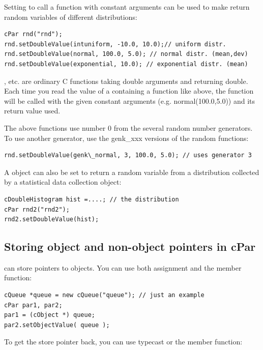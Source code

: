 Setting  to call a function with constant arguments can
be used to make  return random variables of different distributions:

\begin{verbatim}
cPar rnd("rnd");
rnd.setDoubleValue(intuniform, -10.0, 10.0);// uniform distr.
rnd.setDoubleValue(normal, 100.0, 5.0); // normal distr. (mean,dev)
rnd.setDoubleValue(exponential, 10.0); // exponential distr. (mean)
\end{verbatim}

,  etc. are ordinary C functions
taking double arguments and returning double. Each time you read the
value of a  containing a function like above, the
function will be called with the given constant arguments (e.g.
normal(100.0,5.0)) and its return value used.


The above functions use number 0 from the several random number
generators. To use another generator, use the genk\_xxx versions
of the random functions:

\begin{verbatim}
rnd.setDoubleValue(genk\_normal, 3, 100.0, 5.0); // uses generator 3
\end{verbatim}

A  object can also be set to return a random variable from
a distribution collected by a statistical data collection object:

\begin{verbatim}
cDoubleHistogram hist =....; // the distribution
cPar rnd2("rnd2");
rnd2.setDoubleValue(hist);
\end{verbatim}




\subsection{Storing object and non-object pointers in cPar}

 can store pointers to {\opp} objects. You can use both
assignment and the  member function:

\begin{verbatim}
cQueue *queue = new cQueue("queue"); // just an example
cPar par1, par2;
par1 = (cObject *) queue;
par2.setObjectValue( queue );
\end{verbatim}

To get the store pointer back, you can use typecast or the 
member function:

